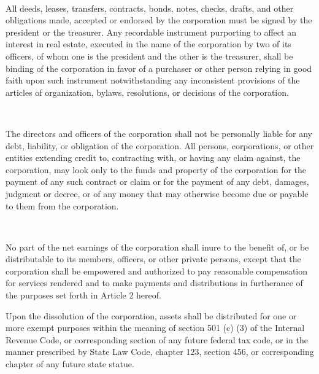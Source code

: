 \begin{art} ~


\begin{asec}[Instruments]

All deeds, leases, transfers, contracts, 
bonds, notes, checks, drafts, and other obligations 
made, accepted or endorsed by the corporation must 
be signed by the president or the treasurer.  Any recordable 
instrument purporting to affect an interest in real 
estate, executed in the name of the corporation by 
two of its officers, of whom one is the president and 
the other is the treasurer, shall be binding of the 
corporation in favor of a purchaser or other person 
relying in good faith upon such instrument notwithstanding 
any inconsistent provisions of the articles of organization, 
bylaws, resolutions, or decisions of the corporation.

\end{asec}
\end{art}


\begin{art} ~


The directors and officers of the corporation shall 
not be personally liable for any debt, liability, or 
obligation of the corporation.  All persons, corporations, 
or other entities extending credit to, contracting 
with, or having any claim against, the corporation, 
may look only to the funds and property of the corporation 
for the payment of any such contract or claim or for 
the payment of any debt, damages, judgment or decree, 
or of any money that may otherwise become due or payable 
to them from the corporation.

\end{art}

\begin{art} ~
\begin{asec}

No part of the net earnings of the corporation shall inure to the
benefit of, or be distributable to its members, officers, or other
private persons, except that the corporation shall be empowered
and authorized to pay reasonable compensation for services
rendered and to make payments and distributions in furtherance of
the purposes set forth in Article 2 hereof.

\end{asec}
\begin{asec}[Dissolution]


Upon the dissolution of the corporation, assets shall be
distributed for one or more exempt purposes within the meaning of
section 501 (c) (3) of the Internal Revenue Code, or corresponding
section of any future federal tax code, or in the manner
prescribed by State Law Code, chapter 123, section 456, or
corresponding chapter of any future state statue.
\end{asec}
\end{art}

